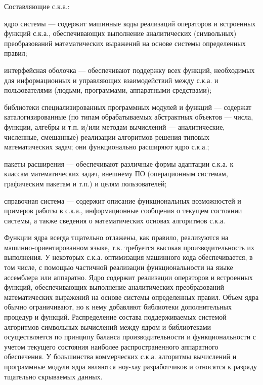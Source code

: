 Составляющие с.к.а.:
\begin{textitemize}
	\item ядро системы --- содержит машинные коды реализаций операторов и встроенных функций с.к.а., обеспечивающих выполнение аналитических (символьных) преобразований математических выражений на основе системы определенных правил;
	\item интерфейсная оболочка --- обеспечивают поддержку всех функций, 
	необходимых для информационных и управляющих взаимодействий между 
	с.к.а. и пользователями (людьми, программами, аппаратными средствами);
	\item библиотеки специализированных программных модулей и функций --- содержат каталогизированные (по типам 
	обрабатываемых абстрактных объектов --- числа, функции, алгебры и т.п. и/или методам вычислений --- аналитические, численные, смешанные) реализации алгоритмов решения типовых математических задач; они функционально расширяют ядро с.к.а.;
	\item пакеты расширения --- обеспечивают различные формы адаптации с.к.а. к классам математических задач, внешнему ПО (операционным системам, графическим пакетам и т.п.) и целям пользователей;
	\item справочная система --- содержит описание функциональных возможностей и примеров работы в с.к.а., информационные сообщения о текущем состоянии системы, а также сведения о математических основах алгоритмов с.к.а.
\end{textitemize}
Функции ядра всегда тщательно отлажены, как правило, реализуются на машинно-ориентированном языке, т.к. требуется высокая производительность их выполнения. У некоторых с.к.а. оптимизация машинного кода обеспечивается, в том числе, с помощью частичной реализации функциональности на языке ассемблера или аппаратно. Ядро содержит реализации операторов и встроенных функций, обеспечивающих выполнение аналитических преобразований математических выражений на основе системы определенных правил. Объем ядра обычно ограничивают, но к нему добавляют библиотеки дополнительных процедур и функций. Распределение состава поддерживаемых системой алгоритмов символьных вычислений между ядром и библиотеками осуществляется по принципу баланса производительности и функциональности с учетом текущего состояния наиболее распространенного аппаратного обеспечения. У большинства коммерческих с.к.а. алгоритмы вычислений и программные модули ядра являются ноу-хау разработчиков и относятся к разряду тщательно скрываемых данных.

